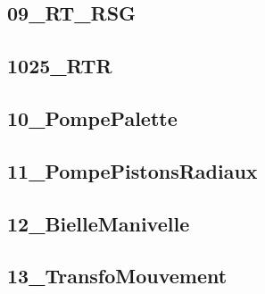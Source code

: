 \subsection{09\_RT\_RSG}
\graphicspath{{../04-Cinématique/TD/VitesseAcceleration/09_RT_RSG/images/}{../04-Cinématique/TD/VitesseAcceleration/09_RT_RSG/}{../Style/png/}}


\subsection{1025\_RTR}
\graphicspath{{../04-Cinématique/TD/VitesseAcceleration/1025_RTR/images/}{../04-Cinématique/TD/VitesseAcceleration/1025_RTR/}{../Style/png/}}


\subsection{10\_PompePalette}
\graphicspath{{../04-Cinématique/TD/VitesseAcceleration/10_PompePalette/images/}{../04-Cinématique/TD/VitesseAcceleration/10_PompePalette/}{../Style/png/}}


\subsection{11\_PompePistonsRadiaux}
\graphicspath{{../04-Cinématique/TD/VitesseAcceleration/11_PompePistonsRadiaux/images/}{../04-Cinématique/TD/VitesseAcceleration/11_PompePistonsRadiaux/}{../Style/png/}}


\subsection{12\_BielleManivelle}
\graphicspath{{../04-Cinématique/TD/VitesseAcceleration/12_BielleManivelle/images/}{../04-Cinématique/TD/VitesseAcceleration/12_BielleManivelle/}{../Style/png/}}


\subsection{13\_TransfoMouvement}
\graphicspath{{../04-Cinématique/TD/VitesseAcceleration/13_TransfoMouvement/images/}{../04-Cinématique/TD/VitesseAcceleration/13_TransfoMouvement/}{../Style/png/}}


